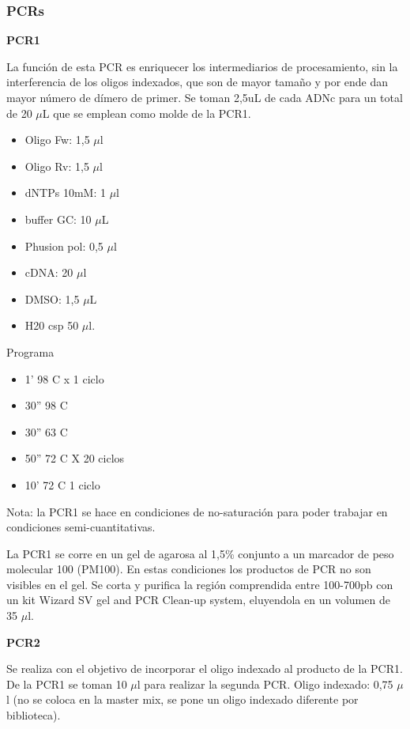 \subsubsection{PCRs}
\textbf{PCR1}

La función de esta PCR es enriquecer los intermediarios de procesamiento, sin la interferencia de los oligos indexados, que son de mayor tamaño y por ende dan mayor número de dímero de primer.
Se toman 2,5uL de cada ADNc para un total de 20 $\mu$L que se emplean como molde de la PCR1. 

\begin{itemize}
	\item Oligo Fw: 1,5 $\mu$l
	\item Oligo Rv: 1,5 $\mu$l
	\item dNTPs 10mM: 1 $\mu$l
	\item buffer GC: 10 $\mu$L
	\item Phusion pol: 0,5 $\mu$l
	\item cDNA:  20 $\mu$l
	\item DMSO: 1,5 $\mu$L
	\item H20 csp 50 $\mu$l.
\end{itemize}

Programa
\begin{itemize}
	\item 1' 98 \degree C x 1 ciclo
	\item 30'' 98 \degree C 
	\item 30'' 63 \degree C 
	\item 50'' 72 \degree C  X 20 ciclos
	\item 10' 72 \degree C  1 ciclo
\end{itemize}

Nota: la PCR1 se hace en condiciones de no-saturación para poder trabajar en condiciones semi-cuantitativas.

La PCR1 se corre  en un gel de agarosa al 1,5\% conjunto a un marcador de peso molecular 100 (PM100).
En estas condiciones los productos de PCR no son visibles en el gel.
Se corta y purifica la región comprendida entre 100-700pb con un kit Wizard SV gel and PCR Clean-up system, eluyendola en un volumen de 35 $\mu$l.

\textbf{PCR2} 

Se realiza con el objetivo de incorporar el oligo indexado al producto de la PCR1.
De la PCR1 se toman 10 $\mu$l para realizar la segunda PCR. 
Oligo indexado: 0,75 $\mu$l (no se coloca en la master mix, se pone un oligo indexado diferente por biblioteca).

